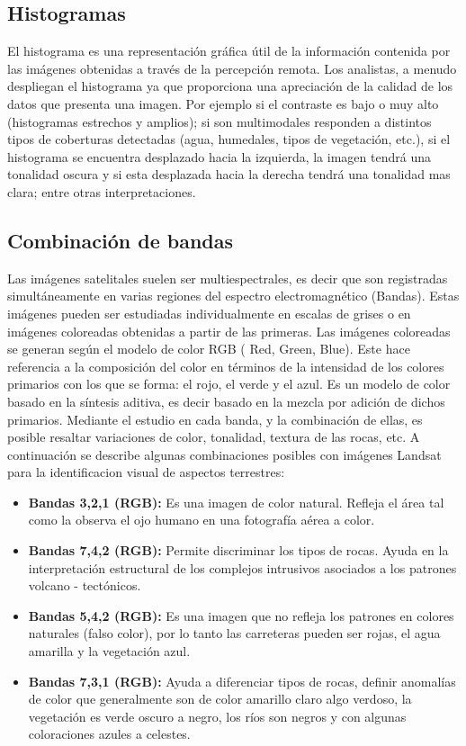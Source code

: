 \subsection{Histogramas}
El histograma es una representaci\'on gr\'afica \'util de la informaci\'on contenida por las im\'agenes obtenidas a trav\'es de la percepci\'on remota. Los analistas, a menudo despliegan el histograma ya que proporciona una apreciaci\'on de la calidad de los datos que presenta una imagen. Por ejemplo si el contraste es bajo o muy alto (histogramas estrechos y amplios); si son multimodales responden a distintos tipos de coberturas detectadas (agua, humedales, tipos de vegetaci\'on, etc.), si el histograma se encuentra desplazado hacia la izquierda, la imagen tendr\'a una tonalidad oscura y si esta desplazada hacia la derecha tendr\'a una tonalidad mas clara; entre otras interpretaciones.

\subsection{Combinaci\'on de bandas}
Las im\'agenes satelitales suelen ser multiespectrales, es decir que son registradas simult\'aneamente en varias regiones del espectro electromagn\'etico (Bandas). Estas im\'agenes pueden ser estudiadas individualmente en escalas de grises o en im\'agenes coloreadas obtenidas a partir de las primeras. Las im\'agenes coloreadas se generan seg\'un el modelo de color RGB ( Red, Green, Blue). Este hace referencia a la composici\'on del color en t\'erminos de la intensidad de los colores primarios con los que se forma: el rojo, el verde y el azul. Es un modelo de color basado en la s\'intesis aditiva, es decir basado en la mezcla por adici\'on de dichos primarios\cite{teledet2015Combi}.
Mediante el estudio en cada banda, y la combinaci\'on de ellas, es posible resaltar variaciones de color, tonalidad, textura de las rocas, etc. A continuaci\'on se describe algunas combinaciones posibles con im\'agenes Landsat para la identificacion visual de aspectos terrestres\cite{lillesand2014remote}:
	\begin{itemize}
		\item \textbf{Bandas 3,2,1 (RGB):} Es una imagen de color natural. Refleja el \'area tal como la observa el ojo humano en una fotograf\'ia a\'erea a color.
		\item  \textbf{Bandas 7,4,2 (RGB):} Permite discriminar los tipos de rocas. Ayuda en la interpretaci\'on estructural de los complejos intrusivos asociados a los patrones volcano - tect\'onicos.
		\item  \textbf{Bandas 5,4,2 (RGB):} Es una imagen que no refleja los patrones en colores naturales (falso color), por lo tanto las carreteras pueden ser rojas, el agua amarilla y la vegetaci\'on azul.
		\item \textbf{Bandas 7,3,1 (RGB):} Ayuda a diferenciar tipos de rocas, definir anomal\'ias de color que generalmente son de color amarillo claro algo verdoso, la vegetaci\'on es verde oscuro a negro, los r\'ios son negros y con algunas coloraciones azules a celestes.		
	\end{itemize}
 

